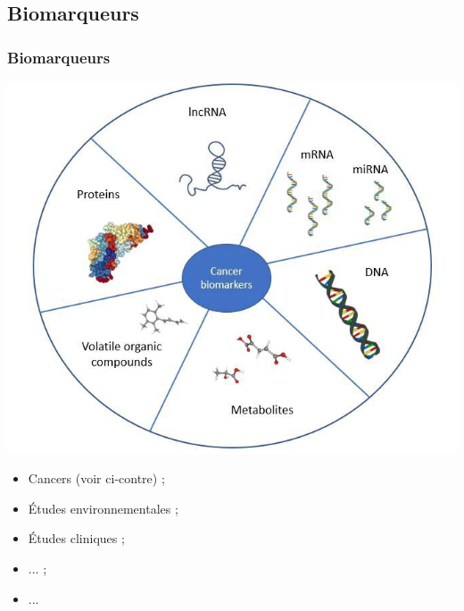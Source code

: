 \documentclass{beamer}
\begin{document}
\subsection{Biomarqueurs}
\begin{frame}
	\frametitle{Biomarqueurs}
	
	\begin{minipage}[ht]{0.50\linewidth}
		\includegraphics[height=0.75\textheight]{img/image_c7193ff4-93ae-4621-9f25-12a30c31291c20220511_092122.jpg}
	\end{minipage} \hfill \begin{minipage}[ht]{0.45\linewidth}
		\begin{itemize}
			\item Cancers (voir ci-contre) ; 
			\item {\'E}tudes environnementales ; 
			\item {\'E}tudes cliniques ; 
			\item ... ; 
			\item ... 
		\end{itemize}
	\end{minipage} 
	
\end{frame}
\end{document}
